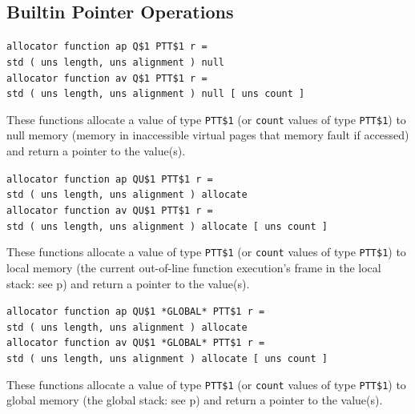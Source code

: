 \documentclass[12pt]{article}
\newcommand{\pagref}[1]{p\pageref{#1}}
\newenvironment{indpar}[1][0.3in]%
	{\begin{list}{}%
		     {\setlength{\itemsep}{0in}%
		      \setlength{\topsep}{0in}%
		      \setlength{\parsep}{1ex}%
		      \setlength{\labelwidth}{#1}%
		      \setlength{\leftmargin}{#1}%
		      \addtolength{\leftmargin}{\labelsep}}%
	 \item}%
	{\end{list}}
\begin{document}
\subsection{Builtin Pointer Operations}
\label{BUILTIN-POINTER-OPERATIONS}

{\tt allocator function ap Q\$1  PTT\$1 r = \\
\hspace*{1in}std ( uns length, uns alignment ) null}%
\label{NULL} \\
{\tt allocator function av Q\$1  PTT\$1 r = \\
\hspace*{1in}std ( uns length, uns alignment ) null [ uns count ]}
\begin{indpar}
These functions allocate a value of type {\tt PTT\$1}
(or {\tt count} values of type {\tt PTT\$1}) to null
memory (memory in inaccessible virtual pages that memory fault if
accessed)
and return a pointer to the value(s).
\end{indpar}

{\tt allocator function ap QU\$1  PTT\$1 r = \\
\hspace*{1in}std ( uns length, uns alignment ) allocate}%
\label{LOCAL} \\
{\tt allocator function av QU\$1  PTT\$1 r = \\
\hspace*{1in}std ( uns length, uns alignment ) allocate [ uns count ]}
\begin{indpar}
These functions allocate a value of type {\tt PTT\$1}
(or {\tt count} values of type {\tt PTT\$1}) to local
memory (the current out-of-line function execution's frame in the local stack:
see \pagref{OUT-OF-LINE-LOCALS})
and return a pointer to the value(s).
\end{indpar}

{\tt allocator function ap QU\$1 *GLOBAL* PTT\$1 r = \\
\hspace*{1in}std ( uns length, uns alignment ) allocate}%
\label{GLOBAL} \\
{\tt allocator function av QU\$1 *GLOBAL* PTT\$1 r = \\
\hspace*{1in}std ( uns length, uns alignment ) allocate [ uns count ]}
\begin{indpar}
These functions allocate a value of type {\tt PTT\$1}
(or {\tt count} values of type {\tt PTT\$1}) to global
memory (the global stack: see \pagref{GLOBAL-MEMORY})
and return a pointer to the value(s).
\end{indpar}
\end{document}
